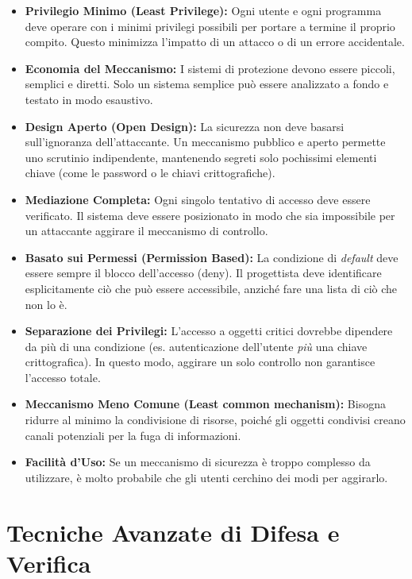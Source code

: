 \documentclass{article}
\begin{document}
\begin{itemize}
    \item \textbf{Privilegio Minimo (Least Privilege):} Ogni utente e ogni programma deve operare con i minimi privilegi possibili per portare a termine il proprio compito. Questo minimizza l'impatto di un attacco o di un errore accidentale.
    \item \textbf{Economia del Meccanismo:} I sistemi di protezione devono essere piccoli, semplici e diretti. Solo un sistema semplice può essere analizzato a fondo e testato in modo esaustivo.
    \item \textbf{Design Aperto (Open Design):} La sicurezza non deve basarsi sull'ignoranza dell'attaccante. Un meccanismo pubblico e aperto permette uno scrutinio indipendente, mantenendo segreti solo pochissimi elementi chiave (come le password o le chiavi crittografiche).
    \item \textbf{Mediazione Completa:} Ogni singolo tentativo di accesso deve essere verificato. Il sistema deve essere posizionato in modo che sia impossibile per un attaccante aggirare il meccanismo di controllo.
    \item \textbf{Basato sui Permessi (Permission Based):} La condizione di \textit{default} deve essere sempre il blocco dell'accesso (deny). Il progettista deve identificare esplicitamente ciò che può essere accessibile, anziché fare una lista di ciò che non lo è.
    \item \textbf{Separazione dei Privilegi:} L'accesso a oggetti critici dovrebbe dipendere da più di una condizione (es. autenticazione dell'utente \textit{più} una chiave crittografica). In questo modo, aggirare un solo controllo non garantisce l'accesso totale.
    \item \textbf{Meccanismo Meno Comune (Least common mechanism):} Bisogna ridurre al minimo la condivisione di risorse, poiché gli oggetti condivisi creano canali potenziali per la fuga di informazioni.
    \item \textbf{Facilità d'Uso:} Se un meccanismo di sicurezza è troppo complesso da utilizzare, è molto probabile che gli utenti cerchino dei modi per aggirarlo.
\end{itemize}

\vspace{0.8cm}

\section*{Tecniche Avanzate di Difesa e Verifica}
\end{document}
